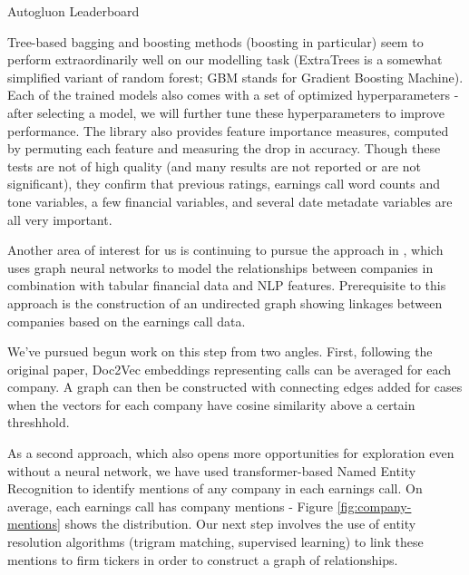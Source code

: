 \documentclass{article}[11pt]
\begin{document}
    \begin{table}
        \centering
        \caption{Autogluon Leaderboard}
        
        \label{tab:autogluon-leaderboard}
    \end{table}

    Tree-based bagging and boosting methods (boosting in particular) seem to perform extraordinarily well on our modelling task (ExtraTrees is a somewhat simplified variant of random forest; GBM stands for Gradient Boosting Machine). Each of the trained models also comes with a set of optimized hyperparameters - after selecting a model, we will further tune these hyperparameters to improve performance. The library also provides feature importance measures, computed by permuting each feature and measuring the drop in accuracy. Though these tests are not of high quality (and many results are not reported or are not significant), they confirm that previous ratings, earnings call word counts and tone variables, a few financial variables, and several date metadate variables are all very important.

    Another area of interest for us is continuing to pursue the approach in \cite{das_credit_2023}, which uses graph neural networks to model the relationships between companies in combination with tabular financial data and NLP features. Prerequisite to this approach is the construction of an undirected graph showing linkages between companies based on the earnings call data. 
    
    We've pursued begun work on this step from two angles. First, following the original paper, Doc2Vec embeddings representing calls can be averaged for each company. A graph can then be constructed with connecting edges added for cases when the vectors for each company have cosine similarity above a certain threshhold.

    As a second approach, which also opens more opportunities for exploration even without a neural network, we have used transformer-based Named Entity Recognition to identify mentions of any company in each earnings call. On average, each earnings call has \avgCompanyMentions \space company mentions - Figure \ref{fig:company-mentions} shows the distribution. Our next step involves the use of entity resolution algorithms (trigram matching, supervised learning) to link these mentions to firm tickers in order to construct a graph of relationships.
\end{document}
